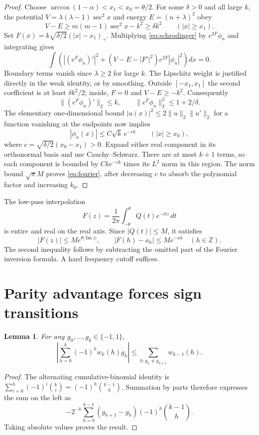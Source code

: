 \documentclass[11pt]{article}
\newtheorem{lemma}[theorem]{Lemma}
\theoremstyle{remark}\newtheorem{remark}[theorem]{Remark}
\begin{document}
\begin{proof}
Choose
$\arccos(1-\alpha)<x_1<x_0=\theta/2$. For some $\delta>0$ and all
large $k$, the potential $V=\lambda(\lambda-1)\sec^2x$ and energy
$E=(n+\lambda)^2$ obey
\[
 V-E\ge m(m-1)\sec^2x-k^2\ge\delta k^2
 \qquad(|x|\ge x_1).
\]
Set $F(x)=k\sqrt{\delta/2}(|x|-x_1)_+$. Multiplying
\eqref{eq:schrodinger} by $e^{2F}\phi_n$ and integrating gives
\begin{equation}\label{eq:agmon}
 \int\left(|(e^F\phi_n)'|^2+
       (V-E-|F'|^2)e^{2F}|\phi_n|^2\right)dx=0.
\end{equation}
Boundary terms vanish since $\lambda\ge2$ for large $k$.
The Lipschitz weight is justified directly in the weak identity, or
by smoothing. Outside $[-x_1,x_1]$ the second coefficient is at least
$\delta k^2/2$; inside, $F=0$ and $V-E\ge-k^2$. Consequently
\[
 \|(e^F\phi_n)'\|_2\le k,\qquad
 \|e^F\phi_n\|_2^2\le1+2/\delta.
\]
The elementary one-dimensional bound
$|u(x)|^2\le2\|u\|_2\|u'\|_2$ for a function vanishing at the
endpoints now implies
\[
 |\phi_n(x)|\le C\sqrt{k}\,e^{-ck}
 \qquad(|x|\ge x_0),
\]
where $c=\sqrt{\delta/2}(x_0-x_1)>0$. Expand either real component
in its orthonormal basis and use Cauchy--Schwarz. There are at most
$k+1$ terms, so each component is bounded by
$Ck e^{-ck}$ times its $L^2$ norm in this region. The norm bound
$\sqrt\pi M$ proves \eqref{eq:fourier}, after decreasing $c$ to
absorb the polynomial factor and increasing $k_0$.
\end{proof}

The low-pass interpolation
\begin{equation}\label{eq:F}
 F(z)=\frac1{2\pi}\int_{-\theta}^{\theta}Q(t)e^{-itz}\,dt
\end{equation}
is entire and real on the real axis. Since $|Q(t)|\le M$, it satisfies
\begin{equation}\label{eq:Fbounds}
 |F(z)|\le M e^{\theta|\operatorname{Im}z|},\qquad
 |F(h)-a_h|\le M e^{-\kappa k}\quad(h\in\mathbb Z).
\end{equation}
The second inequality follows by subtracting the omitted part of the
Fourier inversion formula. A hard frequency cutoff suffices.

\section{Parity advantage forces sign transitions}
\begin{lemma}\label{lem:transitions}
For any $g_0,\ldots,g_k\in\{-1,1\}$,
\begin{equation}\label{eq:transition}
 \left|\sum_{h=0}^k(-1)^h w_k(h)g_h\right|
 \le\sum_{h:g_h\ne g_{h+1}}w_{k-1}(h).
\end{equation}
\end{lemma}
\begin{proof}
The alternating cumulative-binomial identity is
$\sum_{i=0}^h(-1)^i\binom{k}{i}=(-1)^h\binom{k-1}{h}$.
Summation by parts therefore expresses the sum on the left as
\[
 -2^{-k}\sum_{h=0}^{k-1}(g_{h+1}-g_h)(-1)^h\binom{k-1}{h}.
\]
Taking absolute values proves the result.
\end{proof}
\end{document}
